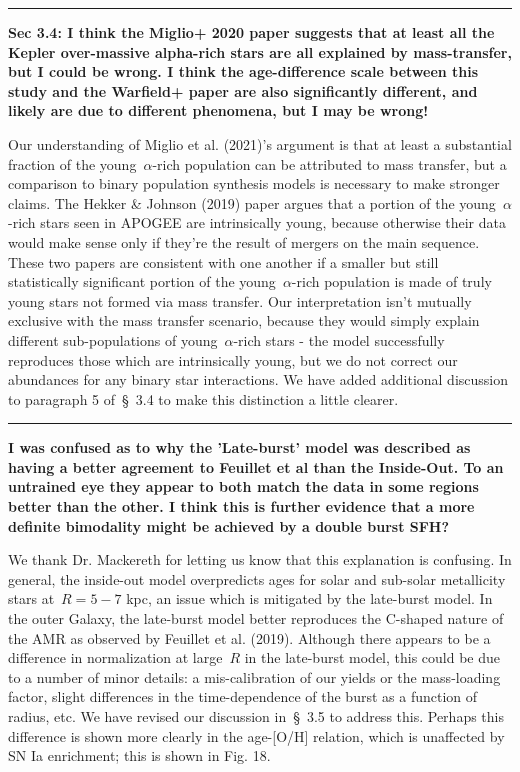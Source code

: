 \documentclass{report}
\newcommand{\breakline}{\noindent\rule{\textwidth}{1pt}}
\begin{document}
\par\null\par 
\breakline 
\par\null\par 
\textbf{
	Sec 3.4: I think the Miglio+ 2020 paper suggests that at least all the 
	Kepler over-massive alpha-rich stars are all explained by mass-transfer, 
	but I could be wrong. 
	I think the age-difference scale between this study and the Warfield+ paper 
	are also significantly different, and likely are due to different 
	phenomena, but I may be wrong! 
} 
\par 
Our understanding of Miglio et al. (2021)'s argument is that at least a 
substantial fraction of the young~$\alpha$-rich population can be attributed 
to mass transfer, but a comparison to binary population synthesis models is 
necessary to make stronger claims. 
The Hekker \& Johnson (2019) paper argues that a portion of the 
young~$\alpha$-rich stars seen in APOGEE are intrinsically young, because 
otherwise their data would make sense only if they're the result of mergers on 
the main sequence. 
These two papers are consistent with one another if a smaller but still 
statistically significant portion of the young~$\alpha$-rich population is made 
of truly young stars not formed via mass transfer. 
Our interpretation isn't mutually exclusive with the mass transfer scenario, 
because they would simply explain different sub-populations of 
young~$\alpha$-rich stars - the model successfully reproduces those which are 
intrinsically young, but we do not correct our abundances for any binary star 
interactions. 
We have added additional discussion to paragraph 5 of~\S~3.4 to make this 
distinction a little clearer. 

\par\null\par 
\breakline 
\par\null\par 
\textbf{
	I was confused as to why the 'Late-burst' model was described as having a 
	better agreement to Feuillet et al than the Inside-Out. 
	To an untrained eye they appear to both match the data in some regions 
	better than the other. 
	I think this is further evidence that a more definite bimodality might be 
	achieved by a double burst SFH? 
} 
\par 
We thank Dr. Mackereth for letting us know that this explanation is confusing. 
In general, the inside-out model overpredicts ages for solar and sub-solar 
metallicity stars at~$R = 5 - 7$ kpc, an issue which is mitigated by the 
late-burst model. 
In the outer Galaxy, the late-burst model better reproduces the C-shaped nature 
of the AMR as observed by Feuillet et al. (2019). 
Although there appears to be a difference in normalization at large~$R$ in the 
late-burst model, this could be due to a number of minor details: a 
mis-calibration of our yields or the mass-loading factor, slight differences in 
the time-dependence of the burst as a function of radius, etc. 
We have revised our discussion in~\S~3.5 to address this. 
Perhaps this difference is shown more clearly in the age-[O/H] relation, which 
is unaffected by SN Ia enrichment; this is shown in Fig. 18. 
\end{document}
